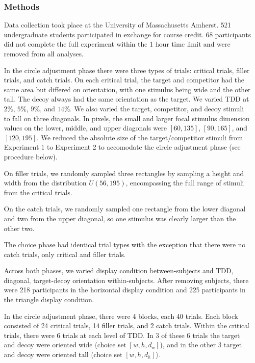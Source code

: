 \documentclass{umassthesis}          %
\begin{document}
\subsubsection{Methods}
Data collection took place at the University of Massachusetts Amherst. 521 undergraduate students participated in exchange for course credit. 68 participants did not complete the full experiment within the 1 hour time limit and were removed from all analyses. 

In the circle adjustment phase there were three types of trials: critical trials, filler trials, and catch trials. On each critical trial, the target and competitor had the same area but differed on orientation, with one stimulus being wide and the other tall. The decoy always had the same orientation as the target. We varied TDD at $2\%$, $5\%$, $9\%$, and $14\%$. We also varied the target, competitor, and decoy stimuli to fall on three diagonals. In pixels, the small and larger focal stimulus dimension values on the lower, middle, and upper diagonals were $[60, 135]$, $[90, 165]$, and $[120,195]$. We reduced the absolute size of the target/competitor stimuli from Experiment 1 to Experiment 2 to accomodate the circle adjustment phase (see procedure  below).

On filler trials, we randomly sampled three rectangles by sampling a height and width from the distribution $U(56,195)$, encompassing the full range of stimuli from the critical trials.

On the catch trials, we randomly sampled one rectangle from the lower diagonal and two from the upper diagonal, so one stimulus was clearly larger than the other two.

The choice phase had identical trial types with the exception that there were no catch trials, only critical and filler trials.

Across both phases, we varied display condition between-subjects and TDD, diagonal, target-decoy orientation within-subjects. After removing subjects, there were 218 participants in the horizontal display condition and 225 participants in the triangle display condition. 

In the circle adjustment phase, there were 4 blocks, each 40 trials. Each block consisted of 24 critical trials, 14 filler trials, and 2 catch trials. Within the critical trials, there were 6 trials at each level of TDD. In 3 of these 6 trials the target and decoy were oriented wide (choice set $[w,h,d_{w}]$), and in the other 3 target and decoy were oriented tall (choice set $[w,h,d_{h}]$). 
\end{document}
